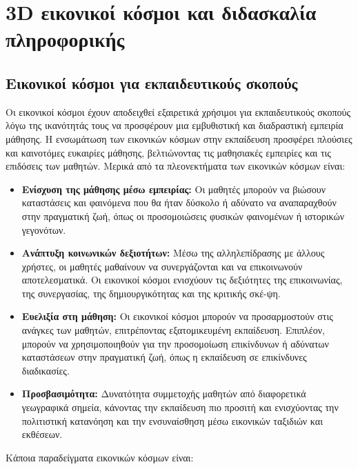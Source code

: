 \hideheader
\section{3D εικονικοί κόσμοι και διδασκαλία πληροφορικής}

\subsection{Εικονικοί κόσμοι για εκπαιδευτικούς σκοπούς}

Οι εικονικοί κόσμοι έχουν αποδειχθεί εξαιρετικά χρήσιμοι για εκπαιδευτικούς σκοπούς λόγω της ικανότητάς τους να προσφέρουν μια εμβυθιστική και διαδραστική εμπειρία μάθησης. Η ενσωμάτωση των εικονικών κόσμων στην εκπαίδευση προσφέρει πλούσιες και καινοτόμες ευκαιρίες μάθησης, βελτιώνοντας τις μαθησιακές εμπειρίες και τις επιδόσεις των μαθητών. Μερικά από τα πλεονεκτήματα των εικονικών κόσμων είναι:

\begin{itemize}
    \item \textbf{Ενίσχυση της μάθησης μέσω εμπειρίας:} Οι μαθητές μπορούν να βιώσουν καταστάσεις και φαινόμενα που θα ήταν δύσκολο ή αδύνατο να αναπαραχθούν στην πραγματική ζωή, όπως οι προσομοιώσεις φυσικών φαινομένων ή ιστορικών γεγονότων\cite{noauthor_virtual_nodate,noauthor_benefits_2019}.
    \item \textbf{Ανάπτυξη κοινωνικών δεξιοτήτων:} Μέσω της αλληλεπίδρασης με άλλους χρήστες, οι μαθητές μαθαίνουν να συνεργάζονται και να επικοινωνούν αποτελεσματικά. Οι εικονικοί κόσμοι ενισχύουν τις δεξιότητες της επικοινωνίας, της συνεργασίας, της δημιουργικότητας και της κριτικής σκέ-ψη\cite{noauthor_explore_nodate,staff_20_2022}.
    \item \textbf{Ευελιξία στη μάθηση:} Οι εικονικοί κόσμοι μπορούν να προσαρμοστούν στις ανάγκες των μαθητών, επιτρέποντας εξατομικευμένη εκπαίδευση. Επιπλέον, μπορούν να χρησιμοποιηθούν για την προσομοίωση επικίνδυνων ή αδύνατων καταστάσεων στην πραγματική ζωή, όπως η εκπαίδευση σε επικίνδυνες διαδικασίες\cite{staff_20_2022}.
    \item \textbf{Προσβασιμότητα:} Δυνατότητα συμμετοχής μαθητών από διαφορετικά γεωγραφικά σημεία, κάνοντας την εκπαίδευση πιο προσιτή και ενισχύοντας την πολιτιστική κατανόηση και την ενσυναίσθηση μέσω εικονικών ταξιδιών και εκθέσεων\cite{noauthor_virtual_nodate}.
\end{itemize}

Κάποια παραδείγματα εικονικών κόσμων είναι:

